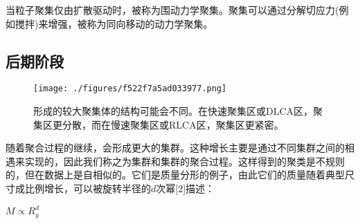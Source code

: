 当粒子聚集仅由扩散驱动时，被称为围动力学聚集。聚集可以通过分解切应力(例如搅拌)来增强，被称为同向移动的动力学聚集。

\subsection{后期阶段}
\begin{figure}[ht]
\centering
\texttt{[image: ./figures/f522f7a5ad033977.png]}
\caption{形成的较大聚集体的结构可能会不同。在快速聚集区或DLCA区，聚集区更分散，而在慢速聚集区或RLCA区，聚集区更紧密。} \label{fig_LZJH_2}
\end{figure}
随着聚合过程的继续，会形成更大的集群。这种增长主要是通过不同集群之间的相遇来实现的，因此我们称之为集群和集群的聚合过程。这样得到的聚类是不规则的，但在数据上是自相似的。它们是质量分形的例子，由此它们的质量随着典型尺寸成比例增长，可以被旋转半径的$d$次幂[2]描述：

$M \propto R_{g}^{d}$